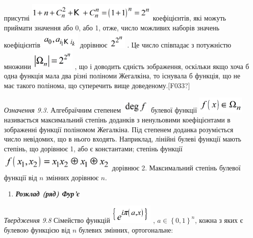 {{{{{{{{{{{{{{{{присутні 
\includegraphics[width=2.5201in,height=0.3646in]{crypt-img/crypt-img123.png} 
коефіцієнтів, які можуть приймати значення або 0, або 1, отже, число можливих
наборів значень коефіцієнтів 
\includegraphics[width=0.7472in,height=0.3071in]{crypt-img/crypt-img124.png} 
дорівнює 
\includegraphics[width=0.3264in,height=0.3264in]{crypt-img/crypt-img125.png} .
Це число співпадає з потужністю множини 
\includegraphics[width=0.8339in,height=0.4016in]{crypt-img/crypt-img126.png} ,
що і доводить єдність зображення, оскільки якщо  хоча б одна функція мала два
різні поліноми Жегалкіна, то існувала б функція, що не має такого полінома, що
суперечить вище доведеному.\textlatin{[F033?]}

\textit{Означення 9.3.} Алгебраїчним степенем 
\includegraphics[width=0.5425in,height=0.2665in]{crypt-img/crypt-img127.png} 
булевої функції 
\includegraphics[width=0.9098in,height=0.3354in]{crypt-img/crypt-img128.png} 
називається максимальний степінь доданків з ненульовими коефіцієнтами в
зображенні функції поліномом Жегалкіна. Під степенем доданка розуміється число
невідомих, що в нього входять. Наприклад, лінійні булеві функції мають степінь,
що дорівнює 1, або є константами; степінь функції 
\includegraphics[width=2.248in,height=0.3583in]{crypt-img/crypt-img129.png}  
дорівнює  2. Максимальний степінь булевої функції від $n$ змінних
дорівнює $n$.


\bigskip

\liststyleWWviiiNumlii
\setcounter{saveenum}{\value{enumi}}
\begin{enumerate}
\setcounter{enumi}{\value{saveenum}}
\item {\bfseries\itshape
Розклад (ряд) Фур’є }
\end{enumerate}
\textit{Твердження 9.8 }Сімейство функцій 
\includegraphics[width=0.8181in,height=0.3661in]{crypt-img/crypt-img130.png} , 
$a\in \left\{0,1\right\}^n$, кожна з яких є  булевою функцією від
$n$ булевих змінних, ортогональне:

}}}}}}}}}}}}}}}}
